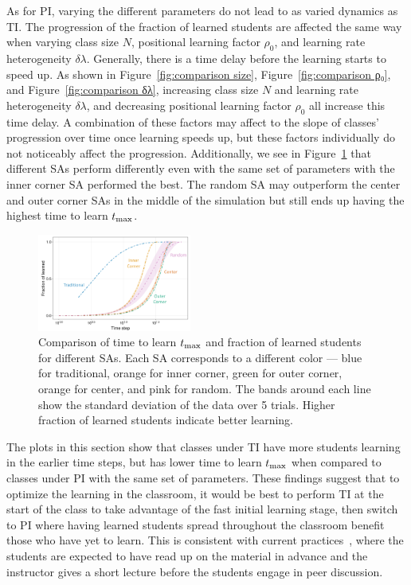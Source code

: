 \documentclass[twocolumn,secnumarabic,amssymb, nobibnotes, aps, prd]{revtex4-2}
\begin{document}
    As for PI, varying the different parameters do not lead to as varied dynamics as TI.
    The progression of the fraction of learned students are affected the same way when varying class size $N$, positional learning factor $\rho_0$, and learning rate heterogeneity $\delta\lambda$.
    Generally, there is a time delay before the learning starts to speed up.
    As shown in Figure~\ref{fig:comparison size}, Figure~\ref{fig:comparison ρ₀}, and Figure~\ref{fig:comparison δλ}, increasing class size $N$ and learning rate heterogeneity $\delta\lambda$, and decreasing positional learning factor $\rho_0$ all increase this time delay.
    A combination of these factors may affect to the slope of classes' progression over time once learning speeds up, but these factors individually do not noticeably affect the progression.
    Additionally, we see in Figure~\ref{fig:comparison SA} that different SAs perform differently even with the same set of parameters with the inner corner SA performed the best.
    The random SA may outperform the center and outer corner SAs in the middle of the simulation but still ends up having the highest time to learn $t_{\rm max}$.


    \begin{figure}[htbp!]
        \centering
        \includegraphics[width=0.45\textwidth]{figures/2D-BPCAIH-analysis/comparison plots/SA.png}
        \caption{Comparison of time to learn $t_{\rm max}$ and fraction of learned students for different SAs.
        Each SA corresponds to a different color --- blue for traditional, orange for inner corner, green for outer corner, orange for center, and pink for random.
        The bands around each line show the standard deviation of the data over 5 trials.
        Higher fraction of learned students indicate better learning.}
        \label{fig:comparison SA}
    \end{figure}

    The plots in this section show that classes under TI have more students learning in the earlier time steps, but has lower time to learn $t_{\rm max}$ when compared to classes under PI with the same set of parameters.
    These findings suggest that to optimize the learning in the classroom, it would be best to perform TI at the start of the class to take advantage of the fast initial learning stage, then switch to PI where having learned students spread throughout the classroom benefit those who have yet to learn.
    This is consistent with current practices~\cite{mazur1997peer,smith2009peer,lasry2008peer,roxas2010seating}, where the students are expected to have read up on the material in advance and the instructor gives a short lecture before the students engage in peer discussion.
\end{document}
